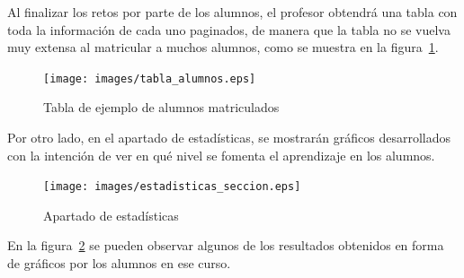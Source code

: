Al finalizar los retos por parte de los alumnos, el profesor obtendrá una tabla con toda la información de cada uno paginados, de manera que la tabla no se vuelva muy extensa al matricular a muchos alumnos, como se muestra en la figura~\ref{fig:21}.

\begin{figure}[!th]
\begin{center}
\texttt{[image: images/tabla\_alumnos.eps]}
\caption{Tabla de ejemplo de alumnos matriculados}
\label{fig:21}
\end{center}
\end{figure}

\newpage
Por otro lado, en el apartado de estadísticas, se mostrarán gráficos desarrollados con la intención de ver en qué nivel se fomenta el aprendizaje en los alumnos.

\begin{figure}[!th]
\begin{center}
\texttt{[image: images/estadisticas\_seccion.eps]}
\caption{Apartado de estadísticas}
\label{fig:22}
\end{center}
\end{figure}

En la figura~\ref{fig:22} se pueden observar algunos de los resultados obtenidos en forma de gráficos por los alumnos en ese curso.